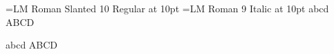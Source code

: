 

\font\testa={LM Roman Slanted 10 Regular} at 10pt
\font\testb={LM Roman 9 Italic}           at 10pt
\testa abcd ABCD\par
\testb abcd ABCD\par
\bye
